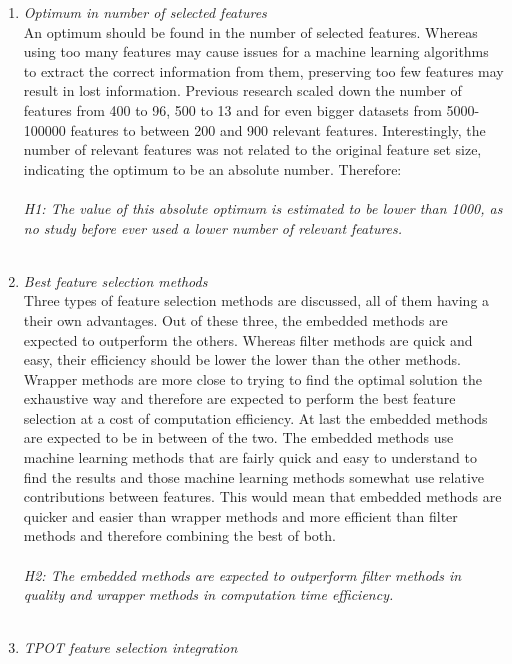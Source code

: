 \documentclass[10pt,a4paper]{report}
\begin{document}
	\begin{enumerate}
		\item \textit{Optimum in number of selected features} \\
		An optimum should be found in the number of selected features. Whereas using too many features may cause issues for a machine learning algorithms to extract the correct information from them, preserving too few features may result in lost information. Previous research scaled down the number of features from 400 to 96\cite{pazzani1997learning}, 500 to 13 and for even bigger datasets from 5000-100000 features to between 200 and 900 relevant features\cite{chen2006combining}. Interestingly, the number of relevant features was not related to the original feature set size, indicating the optimum to be an absolute number. Therefore: \\
		\\
		\emph{H1: The value of this absolute optimum is estimated to be lower than 1000, as no study before ever used a lower number of relevant features.}\\
		\\
		\item \textit{Best feature selection methods} \\
		Three types of feature selection methods are discussed, all of them having a their own advantages. Out of these three, the embedded methods are expected to outperform the others. Whereas filter methods are quick and easy, their efficiency should be lower the lower than the other methods. Wrapper methods are more close to trying to find the optimal solution the exhaustive way and therefore are expected to perform the best feature selection at a cost of computation efficiency. At last the embedded methods are expected to be in between of the two. The embedded methods use machine learning methods that are fairly quick and easy to understand to find the results and those machine learning methods somewhat use relative contributions between features. This would mean that embedded methods are quicker and easier than wrapper methods and more efficient than filter methods and therefore combining the best of both. \\
		\\
		\emph{H2: The embedded methods are expected to outperform filter methods in quality and wrapper methods in computation time efficiency.}\\
		\\
		\item \textit{TPOT feature selection integration} \\

\end{enumerate}
\end{document}
